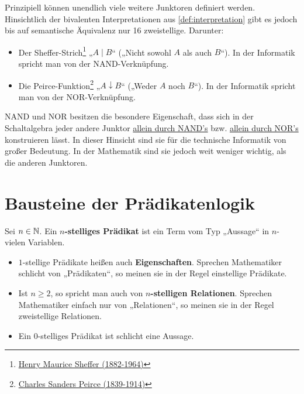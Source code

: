 	
\begin{vorschau}
    Prinzipiell können unendlich viele weitere Junktoren definiert werden. Hinsichtlich der bivalenten Interpretationen aus \cref{def:interpretation} gibt es jedoch bis auf semantische Äquivalenz nur 16 zweistellige. Darunter:
    \begin{itemize}
        \item Der Sheffer-Strich\footnote{\href{https://de.wikipedia.org/wiki/Henry_Maurice_Sheffer}{Henry Maurice Sheffer (1882-1964)}} „$A\mid B$“ („Nicht sowohl $A$ als auch $B$“). In der Informatik spricht man von der NAND-Verknüpfung.
        \item Die Peirce-Funktion\footnote{\href{https://de.wikipedia.org/wiki/Charles_Sanders_Peirce}{Charles Sanders Peirce (1839-1914)}} „$A\downarrow B$“ („Weder $A$ noch $B$“). In der Informatik spricht man von der NOR-Verknüpfung.
    \end{itemize}
    NAND und NOR besitzen die besondere Eigenschaft, dass sich in der Schaltalgebra jeder andere Junktor \href{https://en.wikipedia.org/wiki/NAND_logic}{allein durch NAND's} bzw. \href{https://en.wikipedia.org/wiki/NOR_logic}{allein durch NOR's} konstruieren lässt. In dieser Hinsicht sind sie für die technische Informatik von großer Bedeutung. In der Mathematik sind sie jedoch weit weniger wichtig, als die anderen Junktoren.
\end{vorschau}




	
\section{Bausteine der Prädikatenlogik}


\begin{defin}[Prädikat] \label{def:praedikat}  
    Sei $n\in \mathbb N$. Ein \textbf{$n$-stelliges Prädikat} ist ein Term vom Typ „Aussage“ in $n$-vielen Variablen.
    \begin{itemize}
        \item $1$-stellige Prädikate heißen auch \textbf{Eigenschaften}. Sprechen Mathematiker schlicht von „Prädikaten“, so meinen sie in der Regel einstellige Prädikate.
        \item Ist $n\ge 2$, so spricht man auch von \textbf{$n$-stelligen Relationen}. Sprechen Mathematiker einfach nur von „Relationen“, so meinen sie in der Regel zweistellige Relationen.
        \item Ein $0$-stelliges Prädikat ist schlicht eine Aussage.
    \end{itemize}
\end{defin}


